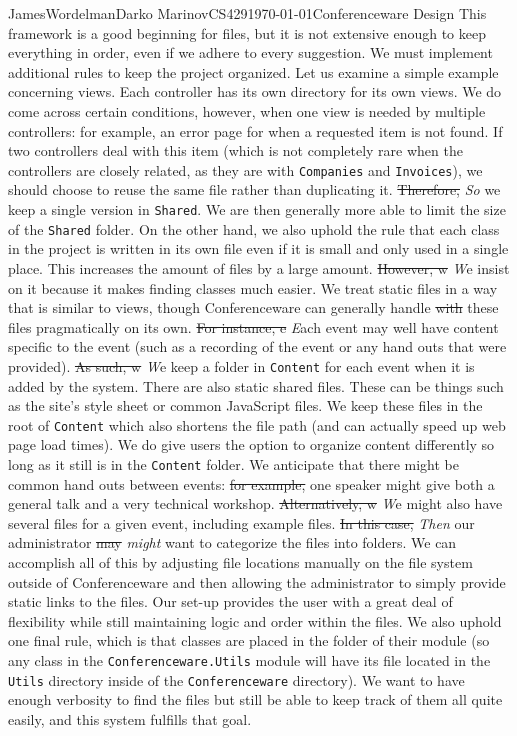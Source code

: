 \documentclass[12pt,letterpaper]{article}
\begin{document}
\begin{mla}{James}{Wordelman}{Darko Marinov}{CS429}{\today}{Conferenceware
Design}
This framework is a good beginning for files, but it is not extensive enough to keep everything in order, even if we adhere to every suggestion. We must implement additional rules to keep the project organized. Let us examine a simple example concerning views. Each controller has its own directory for its own views. We do come across certain conditions, however, when one view is needed by multiple controllers: for example, an error page for when a requested item is not found. If two controllers deal with this item (which is not completely rare when the controllers are closely related, as they are with \texttt{Companies} and \texttt{Invoices}), we should choose to reuse the same file rather than duplicating it. \sout{Therefore,} \textit{So} we keep a single version in \texttt{Shared}. We are then generally more able to limit the size of the \texttt{Shared} folder. On the other hand, we also uphold the rule that each class in the project is written in its own file even if it is small and only used in a single place. This increases the amount of files by a large amount. \sout{However, w} \textit{W}e insist on it because it makes finding classes much easier. We treat static files in a way that is similar to views, though Conferenceware can generally handle \sout{with} these files pragmatically on its own. \sout{For instance, e} \textit{E}ach event may well have content specific to the event (such as a recording of the event or any hand outs that were provided). \sout{As such, w} \textit{W}e keep a folder in \texttt{Content} for each event when it is added by the system. There are also static shared files. These can be things such as the site's style sheet or common JavaScript files. We keep these files in the root of \texttt{Content} which also shortens the file path (and can actually speed up web page load times). We do give users the option to organize content differently so long as it still is in the \texttt{Content} folder. We anticipate that there might be common hand outs between events: \sout{for example,} one speaker might give both a general talk and a very technical workshop. \sout{Alternatively, w} \textit{W}e might also have several files for a given event, including example files. \sout{In this case,} \textit{Then} our administrator \sout{may} \textit{might} want to categorize the files into folders. We can accomplish all of this by adjusting file locations manually on the file system outside of Conferenceware and then allowing the administrator to simply provide static links to the files. Our set-up provides the user with a great deal of flexibility while still maintaining logic and order within the files. We also uphold one final rule, which is that classes are placed in the folder of their module (so any class in the \texttt{Conferenceware.Utils} module will have its file located in the \texttt{Utils} directory inside of the \texttt{Conferenceware} directory). We want to have enough verbosity to find the files but still be able to keep track of them all quite easily, and this system fulfills that goal.


\end{mla}
\end{document}
